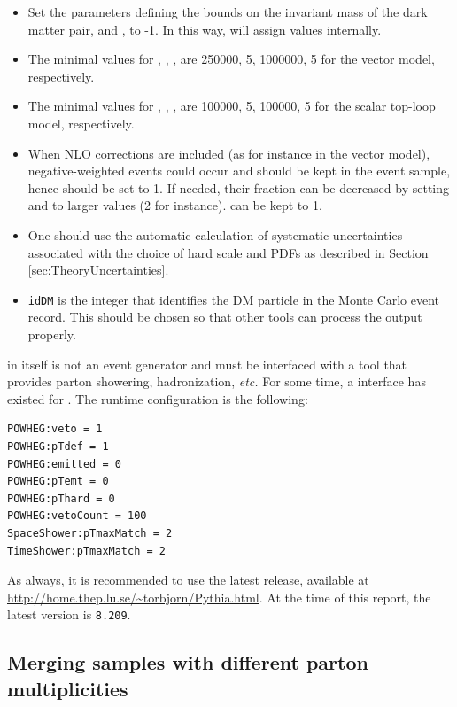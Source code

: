 \begin{itemize}
\item Set the parameters defining the bounds on the invariant mass of the dark matter pair, \masslow and \masshigh, to -1. In this way, \powheg will assign values internally. 
\item The minimal values for \ncallOne, \itmxOne, \ncallTwo, \itmxTwo are 250000, 5, 1000000, 5 for the vector model, respectively.
\item The minimal values for \ncallOne, \itmxOne, \ncallTwo, \itmxTwo are 100000, 5, 100000, 5 for the scalar top-loop model, respectively.
\item When NLO corrections are included (as for instance in the
  vector model), negative-weighted events could occur and should
  be kept in the event sample, hence \withnegweights should be set to
  1. If needed, their fraction can be decreased by setting \foldsci
  and \foldy to larger values (2 for instance). \foldphi can be kept to
  1.
\item One should use the automatic calculation of systematic uncertainties associated with the choice of hard scale and PDFs as described in Section\,\ref{sec:TheoryUncertainties}.

\item \texttt{idDM} is the integer that identifies the DM particle in the Monte Carlo event record.  This should be chosen so that other tools can process the \powheg output properly.

\end{itemize}


\powheg in itself is not an event generator and must be interfaced with a tool that provides parton showering, hadronization, \textit{etc.}   For some time, a
\pythiaEight \cite{Sjostrand:2014zea} interface
has existed for \powheg.  The \pythiaEight runtime configuration is
the following:

\begin{verbatim}
POWHEG:veto = 1
POWHEG:pTdef = 1
POWHEG:emitted = 0
POWHEG:pTemt = 0
POWHEG:pThard = 0
POWHEG:vetoCount = 100
SpaceShower:pTmaxMatch = 2
TimeShower:pTmaxMatch = 2
\end{verbatim}
As always, it is recommended to use the latest \pythiaEight release,
available at \url{http://home.thep.lu.se/~torbjorn/Pythia.html}.
At the time of this report, the latest version is \texttt{8.209}.

\subsection{Merging samples with different parton multiplicities}
\label{sec:monojet_parton_match}

